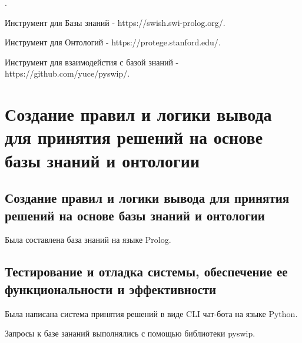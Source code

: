 \documentclass{article}
\begin{document}
.

Инструмент для Базы знаний -
https://swish.swi-prolog.org/.

Инструмент для Онтологий -
https://protege.stanford.edu/.

Инструмент для взаимодейстия с базой знаний -
https://github.com/yuce/pyswip/.


\section{Создание правил и логики вывода для принятия решений на основе базы знаний и онтологии}

\subsection{Создание правил и логики вывода для принятия решений на основе базы знаний и онтологии}

Была составлена база знаний на языке Prolog.

















\subsection{Тестирование и отладка системы, обеспечение ее функциональности и эффективности}

Была написана система принятия решений в виде CLI чат-бота на
языке Python.

Запросы к базе зананий выполнялись с помощью библиотеки pyswip.
\end{document}
